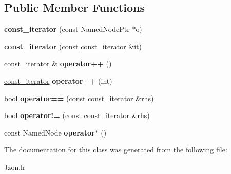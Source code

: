 \subsection*{Public Member Functions}
\begin{DoxyCompactItemize}
\item 
\hypertarget{class_jzon_1_1_object_1_1const__iterator_ab48664cc6a72ab35fb1068771ea611c5}{{\bfseries const\-\_\-iterator} (const Named\-Node\-Ptr $\ast$o)}\label{class_jzon_1_1_object_1_1const__iterator_ab48664cc6a72ab35fb1068771ea611c5}

\item 
\hypertarget{class_jzon_1_1_object_1_1const__iterator_a9728304a0954c212eb826c184fde5803}{{\bfseries const\-\_\-iterator} (const \hyperlink{class_jzon_1_1_object_1_1const__iterator}{const\-\_\-iterator} \&it)}\label{class_jzon_1_1_object_1_1const__iterator_a9728304a0954c212eb826c184fde5803}

\item 
\hypertarget{class_jzon_1_1_object_1_1const__iterator_a9410d62280f836f64c54c5d01d889cb2}{\hyperlink{class_jzon_1_1_object_1_1const__iterator}{const\-\_\-iterator} \& {\bfseries operator++} ()}\label{class_jzon_1_1_object_1_1const__iterator_a9410d62280f836f64c54c5d01d889cb2}

\item 
\hypertarget{class_jzon_1_1_object_1_1const__iterator_a74eb2ae3261167b6c46a4d95bc252fde}{\hyperlink{class_jzon_1_1_object_1_1const__iterator}{const\-\_\-iterator} {\bfseries operator++} (int)}\label{class_jzon_1_1_object_1_1const__iterator_a74eb2ae3261167b6c46a4d95bc252fde}

\item 
\hypertarget{class_jzon_1_1_object_1_1const__iterator_a6b06d72da0f8bd3591ff695f84ab410b}{bool {\bfseries operator==} (const \hyperlink{class_jzon_1_1_object_1_1const__iterator}{const\-\_\-iterator} \&rhs)}\label{class_jzon_1_1_object_1_1const__iterator_a6b06d72da0f8bd3591ff695f84ab410b}

\item 
\hypertarget{class_jzon_1_1_object_1_1const__iterator_a5ba6a742ebf6339357b78fb925d4e97a}{bool {\bfseries operator!=} (const \hyperlink{class_jzon_1_1_object_1_1const__iterator}{const\-\_\-iterator} \&rhs)}\label{class_jzon_1_1_object_1_1const__iterator_a5ba6a742ebf6339357b78fb925d4e97a}

\item 
\hypertarget{class_jzon_1_1_object_1_1const__iterator_a46494d2e6bf4910947b8392beaf9d405}{const Named\-Node {\bfseries operator$\ast$} ()}\label{class_jzon_1_1_object_1_1const__iterator_a46494d2e6bf4910947b8392beaf9d405}

\end{DoxyCompactItemize}


The documentation for this class was generated from the following file\-:\begin{DoxyCompactItemize}
\item 
Jzon.\-h\end{DoxyCompactItemize}
